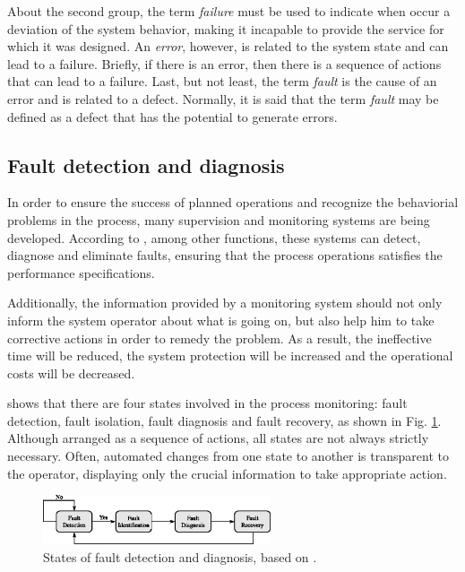 \documentclass[10pt,fleqn,a4paper]{article}
\begin{document}
About the second group, the term {\it failure} must be used to indicate when
occur a deviation of the system behavior, making it incapable to provide the service
for which it was designed. An {\it error}, however, is related to the system
state and can lead to a failure. Briefly, if there is an error, then there is a
sequence of actions that can lead to a failure. Last, but not least, the term
{\it fault} is the cause of an error and is related to a defect. Normally, it is
said that the term {\it fault} may be defined as a defect that has the potential
to generate errors.

\subsection{Fault detection and diagnosis}
In order to ensure the success of planned operations and recognize the
behaviorial problems in the process, many supervision and monitoring systems are
being developed. According to \citet{chiang:2001}, among other functions, these
systems can detect, diagnose and eliminate faults, ensuring that the process
operations satisfies the performance specifications.

Additionally, the information provided by a monitoring system should not only
inform the system operator about what is going on, but also help him to take
corrective actions in order to remedy the problem. As a result, the ineffective
time will be reduced, the system protection will be increased and the
operational costs will be decreased.

\citet{chiang:2001} shows that there are four states involved in the process
monitoring: fault detection, fault isolation, fault diagnosis and fault
recovery, as shown in Fig. \ref{fig:states}. Although arranged as a sequence of
actions, all states are not always strictly necessary. Often, automated changes
from one state to another is transparent to the operator, displaying only the
crucial information to take appropriate action.

\begin{figure}[htb]
\centering
    \includegraphics[width=0.6\textwidth]{imgs/states}
    \caption{States of fault detection and diagnosis, based on
             \citet{chiang:2001}.}
    \label{fig:states}
\end{figure}
\end{document}
